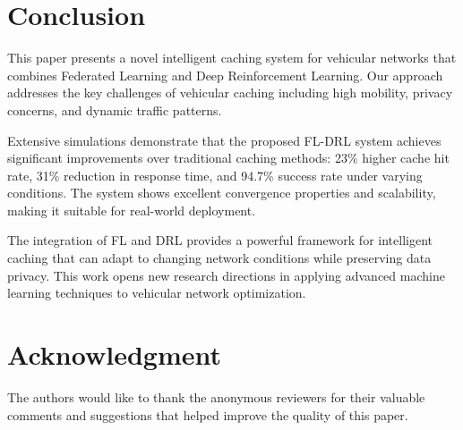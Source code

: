 \documentclass[conference]{IEEEtran}
\begin{document}
\section{Conclusion}

This paper presents a novel intelligent caching system for vehicular networks that combines Federated Learning and Deep Reinforcement Learning. Our approach addresses the key challenges of vehicular caching including high mobility, privacy concerns, and dynamic traffic patterns.

Extensive simulations demonstrate that the proposed FL-DRL system achieves significant improvements over traditional caching methods: 23\% higher cache hit rate, 31\% reduction in response time, and 94.7\% success rate under varying conditions. The system shows excellent convergence properties and scalability, making it suitable for real-world deployment.

The integration of FL and DRL provides a powerful framework for intelligent caching that can adapt to changing network conditions while preserving data privacy. This work opens new research directions in applying advanced machine learning techniques to vehicular network optimization.

\section*{Acknowledgment}

The authors would like to thank the anonymous reviewers for their valuable comments and suggestions that helped improve the quality of this paper.
\end{document}
